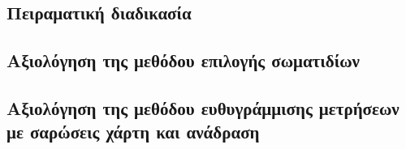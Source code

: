 \subsection{Πειραματική διαδικασία}

\begin{figure}[ht]\centering
  
  \vspace{0.1cm}
  \caption{}
  \label{}
\end{figure}

\begin{figure}[ht]\centering
  
  \caption{}
  \label{}
\end{figure}

\subsection{Αξιολόγηση της μεθόδου επιλογής σωματιδίων}
\subsection{Αξιολόγηση της μεθόδου ευθυγράμμισης μετρήσεων με σαρώσεις χάρτη και ανάδραση}
